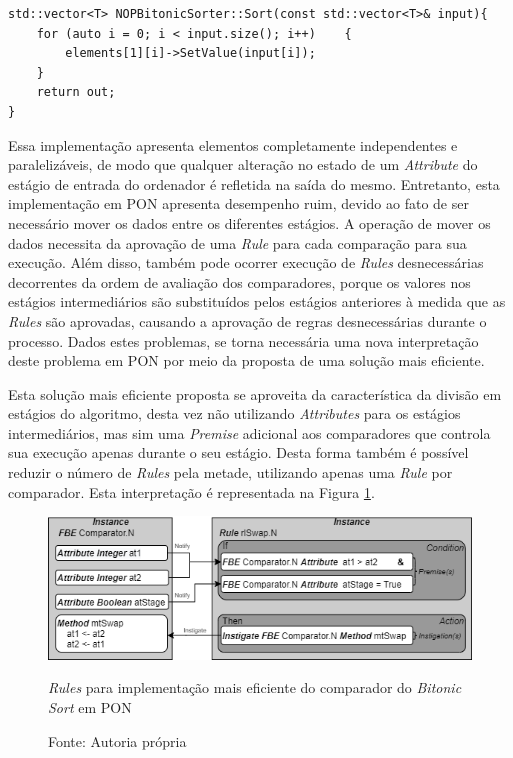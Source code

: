 \begin{lstlisting}[caption = {Trecho de código da estrutura NOPBitonicSorter},
  source = {Autoria própria}, float=htb,
  label = {cod:sort_function}]
std::vector<T> NOPBitonicSorter::Sort(const std::vector<T>& input){
    for (auto i = 0; i < input.size(); i++)    {
        elements[1][i]->SetValue(input[i]);
    }
    return out;
}
\end{lstlisting}

Essa implementação apresenta elementos completamente independentes e
paralelizáveis, de modo que qualquer alteração no estado de um
\textit{Attribute} do estágio de entrada do ordenador é refletida na saída do
mesmo. Entretanto, esta implementação em PON apresenta desempenho ruim, devido
ao fato de ser necessário mover os dados entre os diferentes estágios. A
operação de mover os dados necessita da aprovação de uma \textit{Rule} para cada
comparação para sua execução. Além disso, também pode ocorrer execução de
\textit{Rules} desnecessárias decorrentes da ordem de avaliação dos
comparadores, porque os valores nos estágios intermediários são substituídos
pelos estágios anteriores à medida que as \textit{Rules} são aprovadas,
causando a aprovação de regras desnecessárias durante o processo. Dados estes
problemas, se torna necessária uma nova interpretação deste problema em PON por
meio da proposta de uma solução mais eficiente.

Esta solução mais eficiente proposta se aproveita da característica da divisão
em estágios do algoritmo, desta vez não utilizando \textit{Attributes} para os
estágios intermediários, mas sim uma \textit{Premise} adicional aos comparadores
que controla sua execução apenas durante o seu estágio. Desta forma também é
possível reduzir o número de \textit{Rules} pela metade, utilizando apenas uma
\textit{Rule} por comparador. Esta interpretação é representada na Figura
\ref{fig:rule_bitonic_old}.

\begin{figure}[!htb]
\centering
\includegraphics[width=0.95 \textwidth]{../figures/nop_bitonic_old.png}
\smallskip
\caption{\textit{Rules} para implementação mais eficiente do comparador do
\textit{Bitonic Sort} em PON}
\caption*{Fonte: Autoria própria}
\label{fig:rule_bitonic_old}
\end{figure}

